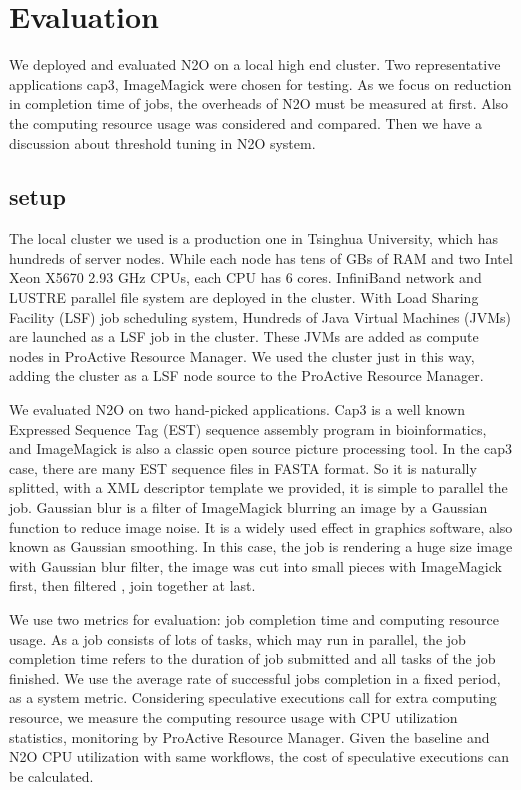 \section{Evaluation}
We deployed and evaluated N2O on a local high end cluster. Two representative applications cap3, ImageMagick were chosen for testing. As we focus on reduction in completion time of jobs, the overheads of N2O must be measured at first. Also the computing resource usage was considered and compared. Then we have a discussion about threshold tuning in N2O system.

\subsection{setup}

The local cluster we used is a production one in Tsinghua University, which has hundreds of  server nodes. While each node has tens of GBs of RAM and two Intel Xeon X5670 2.93 GHz CPUs, each CPU has 6 cores. InfiniBand network and LUSTRE parallel file system are deployed in the cluster. With Load Sharing Facility (LSF) job scheduling system, Hundreds of Java Virtual Machines (JVMs) are launched as a LSF job in the cluster. These JVMs are added as compute nodes in ProActive Resource Manager. We used the cluster just in this way, adding the cluster as a LSF node source to the ProActive Resource Manager.

We evaluated N2O on two hand-picked applications. Cap3 is a well known Expressed Sequence Tag (EST) sequence assembly program in bioinformatics, and ImageMagick is also a classic open source picture processing tool. In the cap3 case, there are many EST sequence files in FASTA format. So it is naturally splitted, with a XML descriptor template we provided, it is simple to parallel the job. Gaussian blur is a filter of ImageMagick blurring an image by a Gaussian function to reduce image noise. It is a widely used effect in graphics software, also known as Gaussian smoothing. In this case, the job is rendering a huge size image with Gaussian blur filter, the image was cut into small pieces with ImageMagick first, then filtered , join together at last. 

We use two metrics for evaluation: job completion time and computing resource usage. As a job consists of lots of tasks, which may run in parallel, the job completion time refers to the duration of job submitted and all tasks of the job finished. We use the average rate of successful jobs completion in a fixed period, as a system metric. Considering speculative executions call for extra computing resource, we measure the computing resource usage with CPU utilization statistics, monitoring by ProActive Resource Manager. Given the baseline and N2O CPU utilization with same workflows, the cost of speculative executions can be calculated.

